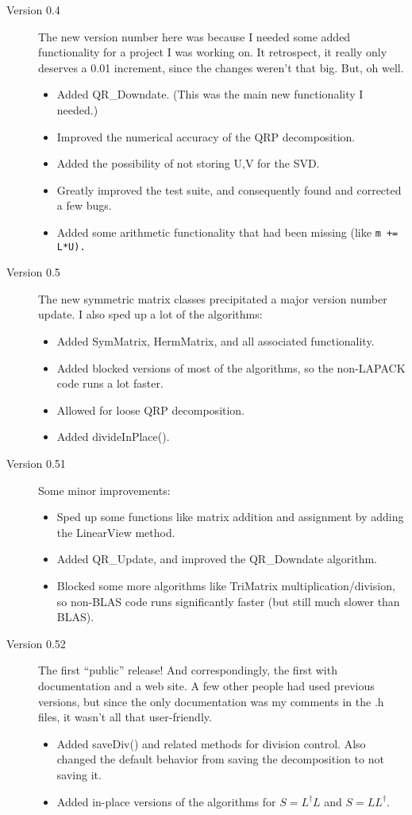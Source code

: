 \begin{description}
\item[Version 0.4]
The new version number here was because I needed some added functionality for a
project I was working on.  It retrospect, it really only deserves a 0.01 increment,
since the changes weren't that big.  But, oh well.
\begin{itemize}
\item
Added QR\_Downdate.  (This was the main new functionality I needed.)
\item
Improved the numerical accuracy of the QRP decomposition.
\item
Added the possibility of not storing U,V for the SVD.
\item
Greatly improved the test suite, and consequently found and corrected a few bugs.
\item
Added some arithmetic functionality that had been missing (like \tt{m += L*U}).
\end{itemize}

\item[Version 0.5]
The new symmetric matrix classes precipitated a major version number update.
I also sped up a lot of the algorithms:
\begin{itemize}
\item
Added SymMatrix, HermMatrix, and all associated functionality.
\item
Added blocked versions of most of the algorithms, so the non-LAPACK
code runs a lot faster.
\item
Allowed for loose QRP decomposition.
\item
Added divideInPlace().
\end{itemize}

\item[Version 0.51]
Some minor improvements:
\begin{itemize}
\item
Sped up some functions like matrix addition and assignment by adding the 
LinearView method.
\item
Added QR\_Update, and improved the QR\_Downdate algorithm.
\item
Blocked some more algorithms like TriMatrix multiplication/division, so non-BLAS
code runs significantly faster (but still much slower than BLAS).
\end{itemize}

\item[Version 0.52]
The first ``public'' release!  And correspondingly, the first with documentation
and a web site.  A few other people had used previous versions, but since the
only documentation was my comments in the .h files, it wasn't all that user-friendly.
\begin{itemize}
\item
Added saveDiv() and related methods for division control.  Also changed the 
default behavior from saving the decomposition to not saving it.
\item
Added in-place versions of the algorithms for $S = L^\dagger L$ and $S = L L^\dagger$.
\end{itemize}


\end{description}
